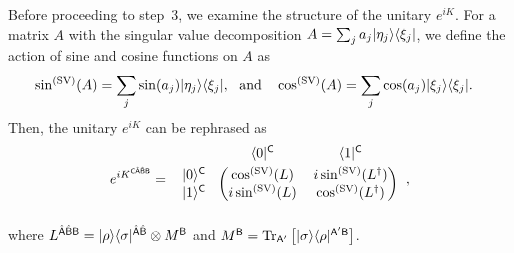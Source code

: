 Before proceeding to step~3, we examine the structure of the unitary $e^{iK}$. 
For a matrix $A$ with the singular value decomposition $A = \sum_j a_j |\eta_j\rangle\langle\xi_j|$, we define the action of sine and cosine functions on $A$ as
\begin{align}
    &\sin^{(\rm SV)}(A) = \sum_j \sin(a_j)\ketbra{\eta_j}{\xi_j}, \ \ \text{and} \ \ \ \cos^{(\rm SV)}(A) = \sum_j \cos(a_j)\ketbra{\xi_j}{\xi_j}.
\end{align}
Then, the unitary $e^{iK}$ can be rephrased as
\begin{align}
\label{eq:block rep. e^{itK}}
    e^{iK^{\sC\hat{\sA}\hat{\sB}\sB}}
    = \hspace{1mm}
\begin{blockarray}{ccc}
& \bra{0}^{\sC}&  \bra{1}^{\sC} \vspace{1mm}\\
\begin{block}{c(cc)}
  \ket{0}^{\sC}\hspace*{1.5mm} & \cos^{(\rm SV)}(L) & i\sin^{(\rm SV)}(L^\dag) \\
  \ket{1}^{\sC}\hspace*{1.5mm} & i\sin^{(\rm SV)}(L) & \cos^{(\rm SV)}(L^\dag) \\
\end{block}
\end{blockarray}\hspace{2.5mm},
\end{align}
where $L^{\hat{{\mathsf{A}}}\hat{{\mathsf{B}}}{\mathsf{B}}} = |\rho\rangle\langle\sigma|^{\hat{{\mathsf{A}}}\hat{{\mathsf{B}}}}\otimes M^{{\mathsf{B}}}$ and $M^{\mathsf{B}} = \operatorname{Tr}_{{\mathsf{A}}'}\big[|\sigma\rangle\langle\rho|^{{\mathsf{A}}'{\mathsf{B}}}\big]$.


